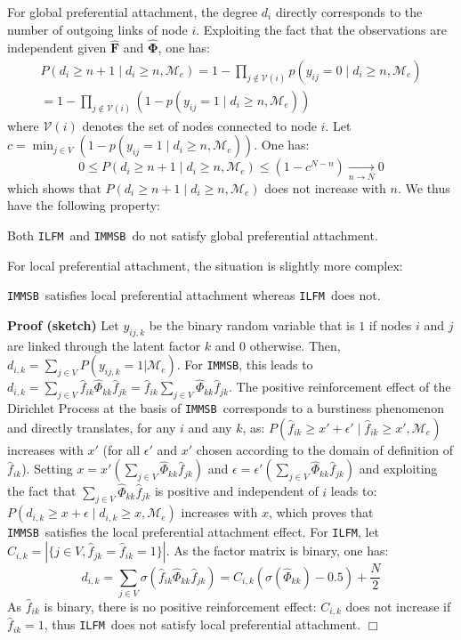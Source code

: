\documentclass{llncs}
\newcommand{\ifm}{\texttt{ILFM}}
\newcommand{\imb}{\texttt{IMMSB}}
\newcommand{\pr}{P}
\newcommand{\mat}[1]{\mathbf{#1}}
\begin{document}
For global preferential attachment, the degree $d_i$ directly corresponds to the number of outgoing links of node $i$. Exploiting the fact that the observations are independent given $\mat{\hat{F}}$ and $\mat{\hat{\Phi}}$, one has:
%
\begin{align}
\pr(d_{i} \ge n+1 \mid d_{i} \ge n, \mathcal{M}_e) = 1 - \prod_{j \notin \mathcal{V}(i)} p(y_{ij} = 0 \mid d_{i} \ge n, \mathcal{M}_e) \nonumber \\
= 1 - \prod_{j \notin \mathcal{V}(i)} (1 - p(y_{ij} = 1 \mid d_{i} \ge n, \mathcal{M}_e)) \nonumber
\end{align}
%
where $\mathcal{V}(i)$ denotes the set of nodes connected to node $i$. Let $c=\min_{j \in V}  (1-p(y_{ij} = 1 \mid d_{i} \ge n, \mathcal{M}_e))$. One has:
%
\[
0 \le \pr(d_{i} \ge n+1 \mid d_{i} \ge n, \mathcal{M}_e) \le (1 - c^{N-n}) \xrightarrow[n \rightarrow N]{} 0
\]
%
which shows that $\pr(d_{i} \ge n+1 \mid d_{i} \ge n, \mathcal{M}_e)$ does not increase with $n$. We thus have the following property:
%
\begin{proposition}[]
\label{pref-attch-glob}
Both \ifm\ and \imb\ do not satisfy global preferential attachment.
\end{proposition}
%
For local preferential attachment, the situation is slightly more complex:
%
\begin{proposition}[]
\label{pref-attch-loc}
\imb\ satisfies local preferential attachment whereas \ifm\ does not.
\end{proposition}
%
\noindent \textbf{Proof (sketch)} Let $y_{ij,k}$ be the binary random variable that is $1$ if nodes $i$ and $j$ are linked through the latent factor $k$ and $0$ otherwise. Then, $d_{i,k} = \sum_{j \in V} \pr(y_{ij,k} =1 | \mathcal{M}_e)$. For \imb, this leads to $d_{i,k} = \sum_{j \in V} \hat{f}_{ik} \hat{\Phi}_{kk} \hat{f}_{jk} = \hat{f}_{ik} \sum_{j \in V} \hat{\Phi}_{kk} \hat{f}_{jk}$. The positive reinforcement effect of the Dirichlet Process \cite{HDP} at the basis of \imb\ corresponds to a burstiness phenomenon and directly translates, for any $i$ and any $k$, as: $\pr(\hat{f}_{ik} \ge x'+\epsilon' \mid \hat{f}_{ik} \ge x',\mathcal{M}_e)$ increases with $x'$ (for all $\epsilon'$ and $x'$ chosen according to the domain of definition of $\hat{f}_{ik}$). Setting $x=x'(\sum_{j\in V} \hat{\Phi}_{kk} \hat{f}_{jk})$ and $\epsilon = \epsilon'(\sum_{j\in V} \hat{\Phi}_{kk} \hat{f}_{jk})$ and exploiting the fact that $\sum_{j\in V} \hat{\Phi}_{kk} \hat{f}_{jk}$ is positive and independent of $i$ leads to: $\pr(d_{i,k} \ge x+\epsilon \mid d_{i,k} \ge x, \mathcal{M}_e)$ increases with $x$, which proves that \imb\ satisfies the local preferential attachment effect. For \ifm,  let $C_{i,k} = |\{j \in V, \hat{f}_{jk} = \hat{f}_{ik} = 1\}|$. As the factor matrix is binary, one has:
%
\[ 
d_{i,k} = \sum_{j\in V} \sigma(\hat{f}_{ik} \hat{\Phi}_{kk} \hat{f}_{jk}) =  C_{i,k} (\sigma(\hat{\Phi}_{kk})-0.5) + \frac{N}{2}
\]
%
As $\hat{f}_{ik}$ is binary, there is no positive reinforcement effect: $C_{i,k}$ does not increase if $\hat{f}_{ik}=1$, thus \ifm\ does not satisfy local preferential attachment. \hspace{4.69cm} $\Box$
\end{document}
